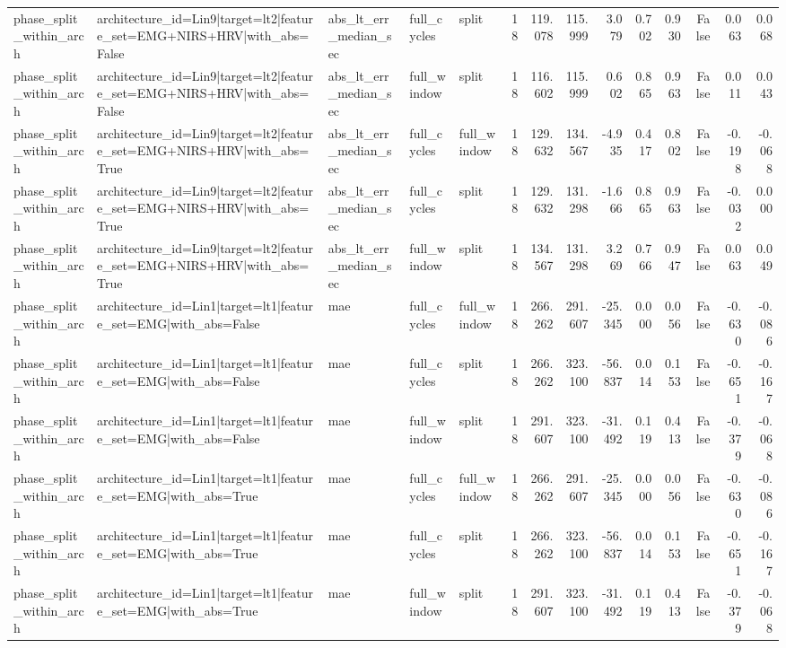 \begin{table}
\begin{tabular}{lllllrrrrrrrrr}
phase_split_within_arch & architecture_id=Lin9|target=lt2|feature_set=EMG+NIRS+HRV|with_abs=False & abs_lt_err_median_sec & full_cycles & split & 18 & 119.078 & 115.999 & 3.079 & 0.702 & 0.930 & False & 0.063 & 0.068 \\
phase_split_within_arch & architecture_id=Lin9|target=lt2|feature_set=EMG+NIRS+HRV|with_abs=False & abs_lt_err_median_sec & full_window & split & 18 & 116.602 & 115.999 & 0.602 & 0.865 & 0.963 & False & 0.011 & 0.043 \\
phase_split_within_arch & architecture_id=Lin9|target=lt2|feature_set=EMG+NIRS+HRV|with_abs=True & abs_lt_err_median_sec & full_cycles & full_window & 18 & 129.632 & 134.567 & -4.935 & 0.417 & 0.802 & False & -0.198 & -0.068 \\
phase_split_within_arch & architecture_id=Lin9|target=lt2|feature_set=EMG+NIRS+HRV|with_abs=True & abs_lt_err_median_sec & full_cycles & split & 18 & 129.632 & 131.298 & -1.666 & 0.865 & 0.963 & False & -0.032 & 0.000 \\
phase_split_within_arch & architecture_id=Lin9|target=lt2|feature_set=EMG+NIRS+HRV|with_abs=True & abs_lt_err_median_sec & full_window & split & 18 & 134.567 & 131.298 & 3.269 & 0.766 & 0.947 & False & 0.063 & 0.049 \\
phase_split_within_arch & architecture_id=Lin1|target=lt1|feature_set=EMG|with_abs=False & mae & full_cycles & full_window & 18 & 266.262 & 291.607 & -25.345 & 0.000 & 0.056 & False & -0.630 & -0.086 \\
phase_split_within_arch & architecture_id=Lin1|target=lt1|feature_set=EMG|with_abs=False & mae & full_cycles & split & 18 & 266.262 & 323.100 & -56.837 & 0.014 & 0.153 & False & -0.651 & -0.167 \\
phase_split_within_arch & architecture_id=Lin1|target=lt1|feature_set=EMG|with_abs=False & mae & full_window & split & 18 & 291.607 & 323.100 & -31.492 & 0.119 & 0.413 & False & -0.379 & -0.068 \\
phase_split_within_arch & architecture_id=Lin1|target=lt1|feature_set=EMG|with_abs=True & mae & full_cycles & full_window & 18 & 266.262 & 291.607 & -25.345 & 0.000 & 0.056 & False & -0.630 & -0.086 \\
phase_split_within_arch & architecture_id=Lin1|target=lt1|feature_set=EMG|with_abs=True & mae & full_cycles & split & 18 & 266.262 & 323.100 & -56.837 & 0.014 & 0.153 & False & -0.651 & -0.167 \\
phase_split_within_arch & architecture_id=Lin1|target=lt1|feature_set=EMG|with_abs=True & mae & full_window & split & 18 & 291.607 & 323.100 & -31.492 & 0.119 & 0.413 & False & -0.379 & -0.068 \\

\end{tabular}
\end{table}
